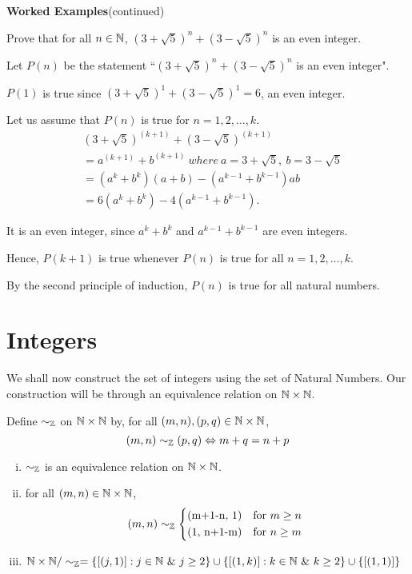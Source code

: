 \documentclass[11pt]{scrartcl}
\begin{document}
\pagebreak

	\begin{flushleft}
			\textbf{Worked Examples}(continued)
	\end{flushleft}
	
	\begin{example}
		Prove that for all $n \in \mathbb N$, $(3+\sqrt{5})^{n} + (3-\sqrt{5})^{n}$ is an even integer.
	\end{example}
	Let $P(n)$ be the statement ``$(3+\sqrt{5})^{n} + (3-\sqrt{5})^{n}$ is an even integer".
	
	$P(1)$ is true since $(3+\sqrt{5})^{1} + (3-\sqrt{5})^{1} = 6$, an even integer.
	
	Let us assume that $P(n)$ is true for $n=1,2,\dots,k$.
		\begin{align*}
			&(3+\sqrt{5})^{(k+1)} + (3-\sqrt{5})^{(k+1)}\\
			&= a^{(k+1)} + b^{(k+1)}\ where\ a=3+\sqrt{5},\ b=3-\sqrt{5}\\
			&= (a^{k} + b^{k})(a+b) - (a^{k-1} + b^{k-1})ab\\
			&= 6(a^{k} + b^{k}) - 4(a^{k-1} + b^{k-1}).		
		\end{align*}
	
	It is an even integer, since $a^{k}+b^{k}$ and $a^{k-1}+b^{k-1}$ are even integers.
	
	Hence, $P(k+1)$ is true whenever $P(n)$ is true for all $n=1,2,\dots,k$.
	
	By the second principle of induction, $P(n)$ is true for all natural numbers.
	
	\section{Integers}
	
	We shall now construct the set of integers using the set of Natural Numbers. Our construction will be through an equivalence relation on $\mathbb N \times \mathbb N$.
	
	\begin{definition}
		Define $\sim_{\mathbb Z}$ on $\mathbb N \times \mathbb N$ by, for all $(m,n),(p,q) \in \mathbb N \times \mathbb N$,
		 $$(m,n)\sim_{\mathbb Z}(p,q) \Leftrightarrow m+q = n+p$$
	\end{definition}

	\begin{lemma}
		\begin{enumerate}[i)]
			\item $\sim_{\mathbb Z}$ is an equivalence relation on $\mathbb N \times \mathbb N$.
			\item for all $(m,n) \in \mathbb N \times \mathbb N$,
				\[(m,n) \sim_{\ZZ}
				\begin{cases*}
					$(m+1-n, 1)$ & for $m\geq n$\\
					$(1, n+1-m)$ & for $n\geq m$
				\end{cases*}\]
			\item $\NN \times \NN / \sim_{\ZZ} = \{[(j,1)] : j \in \NN\ \&\ j\geq 2\} \cup \{[(1,k)] : k \in \NN\ \&\ k\geq 2\} \cup \{[(1,1)]\}$
		\end{enumerate}
	\end{lemma}
\end{document}
